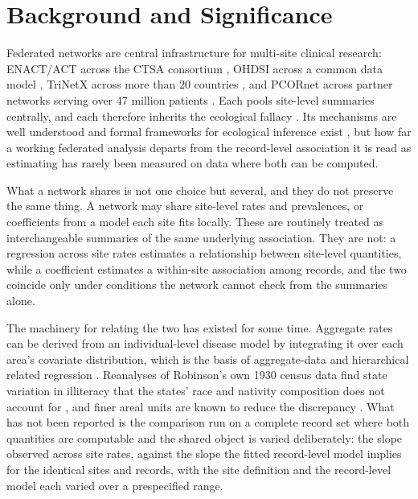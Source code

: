 \documentclass[11pt]{article}
\begin{document}
\section{Background and Significance}

Federated networks are central infrastructure for multi-site clinical
research: ENACT/ACT across the CTSA consortium
\cite{visweswaran2018act}, OHDSI across a common data model
\cite{hripcsak2015ohdsi}, TriNetX across more than 20 countries
\cite{trinetx2024}, and PCORnet across partner networks serving over
47 million patients \cite{fleurence2014pcornet}.  Each pools
site-level summaries centrally, and each therefore inherits the
ecological fallacy \cite{robinson1950ecological}.  Its mechanisms are
well understood \cite{greenland1992ecological,greenland2001ecologic}
and formal frameworks for ecological inference exist
\cite{king1997ecological,wakefield2003ecological,wakefield2008ecologic},
but how far a working federated analysis departs from the
record-level association it is read as estimating has rarely been
measured on data where both can be computed.

What a network shares is not one choice but several, and they do not
preserve the same thing.  A network may share site-level rates and
prevalences, or coefficients from a model each site fits locally.  These are
routinely treated as interchangeable summaries of the same underlying
association.  They are not: a regression across site rates estimates a
relationship between site-level quantities, while a coefficient
estimates a within-site association among records, and the two coincide
only under conditions the network cannot check from the summaries alone.

The machinery for relating the two has existed for some time.  Aggregate
rates can be derived from an individual-level disease model by
integrating it over each area's covariate distribution, which is the
basis of aggregate-data and hierarchical related regression
\cite{wakefield2008twophase,jackson2008hierarchical,prentice1995aggregate}.
Reanalyses of Robinson's own 1930 census data find state variation in
illiteracy that the states' race and nativity composition does not
account for \cite{subramanian2009revisiting}, and finer areal units are
known to reduce the discrepancy \cite{best2001ecological,lancaster2006reducing}.
What has not been reported is the comparison run on a complete record
set where both quantities are computable and the shared object is varied
deliberately: the slope observed across site rates, against the slope the
fitted record-level model implies for the identical sites and records,
with the site definition and the record-level model each varied over a
prespecified range.
\end{document}
